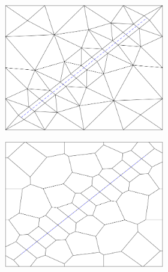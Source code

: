 \begin{figure}[htp]
    \centering
    \begin{subfigure}[b]{\textwidth}
        \centering
        \begin{subfigure}[b]{0.35\textwidth}
            \centering
            \includegraphics[width=\textwidth]{report/Images/Combining software/Faults as transfinite grids/face_constraint_as_transfinite_delaunay_1.png}
        \end{subfigure}
        \begin{subfigure}[b]{0.35\textwidth}
            \centering
            \includegraphics[width=\textwidth]{report/Images/Combining software/Faults as transfinite grids/face_constraint_as_transfinite_pebi_1.png}

\end{subfigure}
\end{subfigure}
\end{figure}
